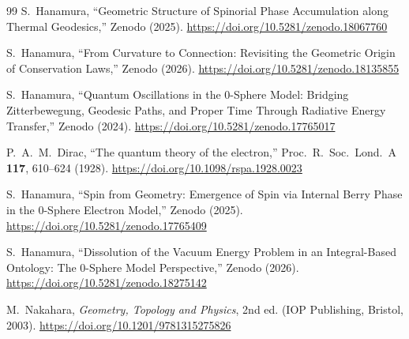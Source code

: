 \documentclass[12pt,letterpaper]{article}
\begin{document}
\begin{thebibliography}{99}
S.~Hanamura,
``Geometric Structure of Spinorial Phase Accumulation along Thermal Geodesics,''
Zenodo (2025).
\href{https://doi.org/10.5281/zenodo.18067760}{https://doi.org/10.5281/zenodo.18067760}

S.~Hanamura,
``From Curvature to Connection: Revisiting the Geometric Origin of Conservation Laws,''
Zenodo (2026).
\href{https://doi.org/10.5281/zenodo.18135855}{https://doi.org/10.5281/zenodo.18135855}

S.~Hanamura,
``Quantum Oscillations in the 0-Sphere Model: Bridging Zitterbewegung, Geodesic Paths, and Proper Time Through Radiative Energy Transfer,''
Zenodo (2024).
\href{https://doi.org/10.5281/zenodo.17765017}{https://doi.org/10.5281/zenodo.17765017}

P.~A.~M.~Dirac,
``The quantum theory of the electron,''
Proc.\ R.\ Soc.\ Lond.\ A \textbf{117}, 610--624 (1928).
\href{https://doi.org/10.1098/rspa.1928.0023}{https://doi.org/10.1098/rspa.1928.0023}

S.~Hanamura,
``Spin from Geometry: Emergence of Spin via Internal Berry Phase in the 0-Sphere Electron Model,''
Zenodo (2025).
\href{https://doi.org/10.5281/zenodo.17765409}{https://doi.org/10.5281/zenodo.17765409}

S.~Hanamura,
``Dissolution of the Vacuum Energy Problem in an Integral-Based Ontology: The 0-Sphere Model Perspective,''
Zenodo (2026).
\href{https://doi.org/10.5281/zenodo.18275142}{https://doi.org/10.5281/zenodo.18275142}

M.~Nakahara,
\textit{Geometry, Topology and Physics}, 2nd ed.
(IOP Publishing, Bristol, 2003).
\href{https://doi.org/10.1201/9781315275826}{https://doi.org/10.1201/9781315275826}

\end{thebibliography}

\end{document}
